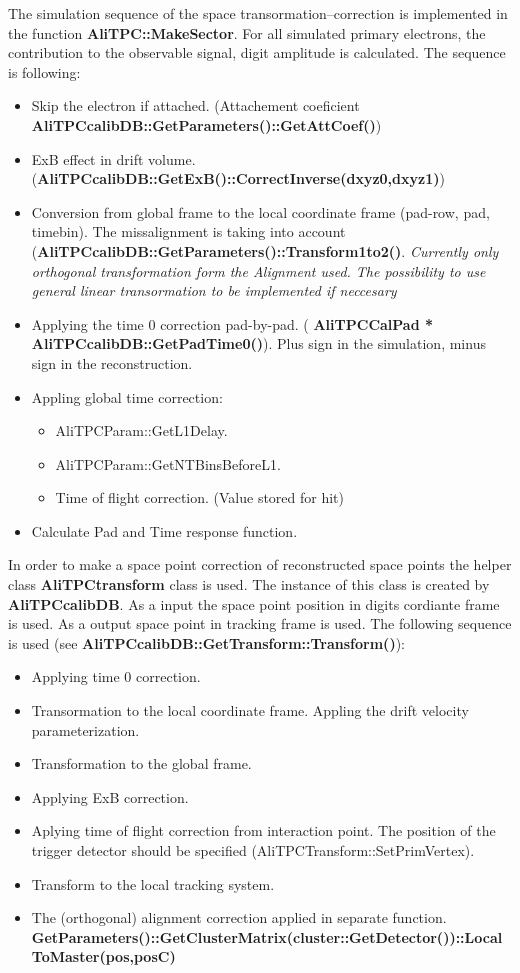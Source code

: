 \documentclass{elsart}
\begin{document}
The simulation sequence of the space transormation--correction is implemented in the function {\bf{AliTPC::MakeSector}}. For all simulated primary electrons, the contribution to the observable signal, digit amplitude is calculated. The sequence is following:
\begin{itemize}
\item Skip the electron if attached. (Attachement coeficient {\bf{AliTPCcalibDB::GetParameters()::GetAttCoef()}})
\item  ExB effect in drift volume. ({\bf{AliTPCcalibDB::GetExB()::CorrectInverse(dxyz0,dxyz1)}})
\item Conversion from global frame to the local coordinate frame (pad-row, pad, timebin). The missalignment is taking into account ({\bf{AliTPCcalibDB::GetParameters()::Transform1to2()}}. {\it{ Currently only orthogonal transformation form the Alignment used. The possibility to use general linear transormation to be implemented if neccesary}}  
\item Applying the time 0 correction pad-by-pad. ( {\bf{AliTPCCalPad * AliTPCcalibDB::GetPadTime0()}}). Plus sign in the simulation, minus sign in the reconstruction.
\item Appling global time correction:
\begin{itemize}
\item  AliTPCParam::GetL1Delay.
\item  AliTPCParam::GetNTBinsBeforeL1.
\item  Time of flight correction. (Value stored for hit)	 
\end{itemize} 
\item Calculate Pad and Time response function.
\end{itemize}

In order to make a space point correction of reconstructed space points the helper class {\bf{AliTPCtransform}} class is used. 
The instance of this class is created by {\bf{AliTPCcalibDB}}. As a input the space point position in digits cordiante frame is used. As a output space point in tracking frame is used. The following sequence is used ({see \bf{AliTPCcalibDB::GetTransform::Transform()}}):

\begin{itemize}
\item Applying time 0 correction.
\item Transormation to the local coordinate frame. Appling the drift velocity parameterization.
\item Transformation to the global frame.
\item Applying ExB correction.
\item Aplying time of flight correction from interaction point. The position of the trigger detector should  be specified (AliTPCTransform::SetPrimVertex).
\item Transform to the local tracking system.
\item The (orthogonal) alignment correction applied in separate function.
       {\bf{GetParameters()::GetClusterMatrix(cluster::GetDetector())::LocalToMaster(pos,posC)}}
\end{itemize}
\end{document}
